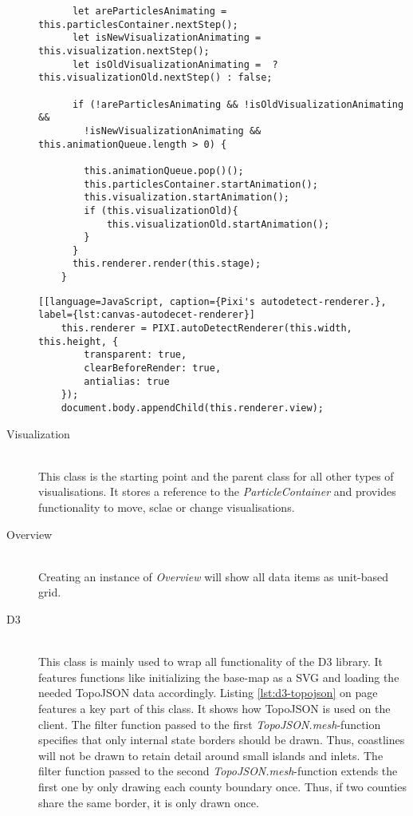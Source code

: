 \begin{description}
\begin{lstlisting}
      let areParticlesAnimating = this.particlesContainer.nextStep();
      let isNewVisualizationAnimating = this.visualization.nextStep();
      let isOldVisualizationAnimating =  ? this.visualizationOld.nextStep() : false;

      if (!areParticlesAnimating && !isOldVisualizationAnimating &&
        !isNewVisualizationAnimating && this.animationQueue.length > 0) {

        this.animationQueue.pop()();
        this.particlesContainer.startAnimation();
        this.visualization.startAnimation();
        if (this.visualizationOld){
            this.visualizationOld.startAnimation();
        }
      }
      this.renderer.render(this.stage);
    }
\end{lstlisting}

\begin{lstlisting}[[language=JavaScript, caption={Pixi's autodetect-renderer.}, label={lst:canvas-autodecet-renderer}]
    this.renderer = PIXI.autoDetectRenderer(this.width, this.height, {
        transparent: true,
        clearBeforeRender: true,
        antialias: true
    });
    document.body.appendChild(this.renderer.view);
\end{lstlisting}

\item[Visualization] \hfill \\
This class is the starting point and the parent class for all other types of visualisations. It stores a reference to the \textit{ParticleContainer} and provides functionality to move, sclae or change visualisations.

\item[Overview] \hfill \\
Creating an instance of \textit{Overview} will show all data items as unit-based grid.

\item[D3] \hfill \\
This class is mainly used to wrap all functionality of the \ac{D3} library. It features functions like initializing the base-map as a \ac{SVG} and loading the needed TopoJSON data accordingly. Listing \ref{lst:d3-topojson} on page \pageref{lst:d3-topojson} features a key part of this class. It shows how TopoJSON is used on the client. The filter function passed to the first \textit{TopoJSON.mesh}-function specifies that only internal state borders should be drawn. Thus, coastlines will not be drawn to retain detail around small islands and inlets. The filter function passed to the second \textit{TopoJSON.mesh}-function extends the first one by only drawing each county boundary once. Thus, if two counties share the same border, it is only drawn once.


\end{description}
